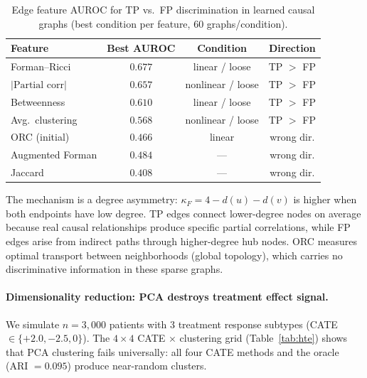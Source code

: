 \documentclass[11pt]{article}
\begin{document}
\begin{table}[t]
\centering
\caption{Edge feature AUROC for TP vs.\ FP discrimination in learned causal graphs (best condition per feature, 60 graphs/condition).}
\label{tab:curvature}
\small
\begin{tabular}{@{}lccc@{}}
\toprule
\textbf{Feature} & \textbf{Best AUROC} & \textbf{Condition} & \textbf{Direction} \\
\midrule
Forman--Ricci & $\mathbf{0.677}$ & linear / loose & TP $>$ FP \\
$|\text{Partial corr}|$ & $0.657$ & nonlinear / loose & TP $>$ FP \\
Betweenness & $0.610$ & linear / loose & TP $>$ FP \\
Avg.\ clustering & $0.568$ & nonlinear / loose & TP $>$ FP \\
\midrule
ORC (initial) & $0.466$ & linear & wrong dir. \\
Augmented Forman & $0.484$ & --- & wrong dir. \\
Jaccard & $0.408$ & --- & wrong dir. \\
\bottomrule
\end{tabular}
\end{table}

The mechanism is a degree asymmetry: $\kappa_F = 4 - d(u) - d(v)$ is higher when both endpoints have low degree.
TP edges connect lower-degree nodes on average because real causal relationships produce specific partial correlations, while FP edges arise from indirect paths through higher-degree hub nodes.
ORC measures optimal transport between neighborhoods (global topology), which carries no discriminative information in these sparse graphs.

\paragraph{Dimensionality reduction: PCA destroys treatment effect signal.}
We simulate $n = 3{,}000$ patients with 3 treatment response subtypes (CATE $\in \{+2.0, -2.5, 0\}$).
The $4 \times 4$ CATE $\times$ clustering grid (Table~\ref{tab:hte}) shows that PCA clustering fails universally: all four CATE methods and the oracle (ARI $= 0.095$) produce near-random clusters.
\end{document}
